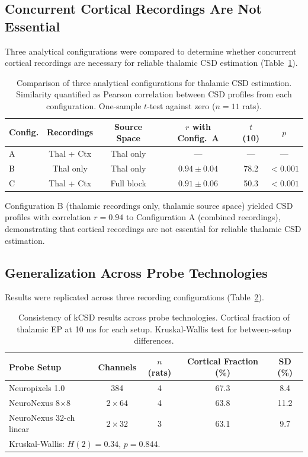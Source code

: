 \documentclass[11pt]{article}
\begin{document}
\subsection{Concurrent Cortical Recordings Are Not Essential}

Three analytical configurations were compared to determine whether concurrent cortical recordings are necessary for reliable thalamic CSD estimation (Table~\ref{tab:configurations}).

\begin{table}[H]
\centering
\caption{Comparison of three analytical configurations for thalamic CSD estimation. Similarity quantified as Pearson correlation between CSD profiles from each configuration. One-sample $t$-test against zero ($n = 11$ rats).}
\label{tab:configurations}
\begin{tabular}{lccccc}
\toprule
\textbf{Config.} & \textbf{Recordings} & \textbf{Source Space} & \textbf{$r$ with Config.\ A} & \textbf{$t$(10)} & \textbf{$p$} \\
\midrule
A & Thal + Ctx & Thal only & --- & --- & --- \\
B & Thal only & Thal only & $0.94 \pm 0.04$ & 78.2 & $< 0.001$ \\
C & Thal + Ctx & Full block & $0.91 \pm 0.06$ & 50.3 & $< 0.001$ \\
\bottomrule
\end{tabular}
\end{table}

Configuration B (thalamic recordings only, thalamic source space) yielded CSD profiles with correlation $r = 0.94$ to Configuration A (combined recordings), demonstrating that cortical recordings are not essential for reliable thalamic CSD estimation.

\subsection{Generalization Across Probe Technologies}

Results were replicated across three recording configurations (Table~\ref{tab:probes}).

\begin{table}[H]
\centering
\caption{Consistency of kCSD results across probe technologies. Cortical fraction of thalamic EP at 10 ms for each setup. Kruskal-Wallis test for between-setup differences.}
\label{tab:probes}
\begin{tabular}{lcccc}
\toprule
\textbf{Probe Setup} & \textbf{Channels} & \textbf{$n$ (rats)} & \textbf{Cortical Fraction (\%)} & \textbf{SD (\%)} \\
\midrule
Neuropixels 1.0 & 384 & 4 & 67.3 & 8.4 \\
NeuroNexus 8$\times$8 & $2 \times 64$ & 4 & 63.8 & 11.2 \\
NeuroNexus 32-ch linear & $2 \times 32$ & 3 & 63.1 & 9.7 \\
\bottomrule
\multicolumn{5}{l}{\small Kruskal-Wallis: $H(2) = 0.34$, $p = 0.844$.} \\
\end{tabular}
\end{table}
\end{document}
